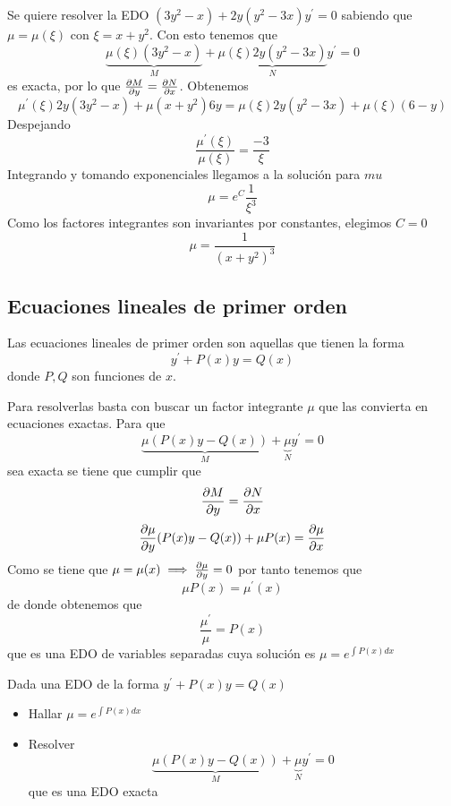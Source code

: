 \begin{example}
Se quiere resolver la EDO $(3y^2-x)+2y(y^2-3x)y^\prime = 0$ sabiendo que $\mu = \mu(\xi)$ con $\xi = x+y^2$. Con esto tenemos que $$\underbrace{\mu(\xi)(3y^2-x)}_M+\underbrace{\mu(\xi)2y(y^2-3x)}_Ny^\prime = 0$$ es exacta, por lo que $\partialder{y}{M} = \partialder{x}{N}$.
Obtenemos $$\mu^\prime(\xi)2y(3y^2-x)+\mu(x+y^2)6y = \mu(\xi)2y(y^2-3x)+\mu(\xi)(6-y)$$
Despejando $$\frac{\mu^\prime(\xi)}{\mu(\xi)} = \frac{-3}{\xi}$$
Integrando y tomando exponenciales llegamos a la solución para $mu$ $$\mu = e^C\frac{1}{\xi^3}$$
Como los factores integrantes son invariantes por constantes, elegimos $C=0$ $$\mu = \frac{1}{(x+y^2)^3}$$
\end{example}

\subsection{Ecuaciones lineales de primer orden}
Las ecuaciones lineales de primer orden son aquellas que tienen la forma $$y^\prime +P(x)y=Q(x)$$ donde $P,Q$ son funciones de $x$.

Para resolverlas basta con buscar un factor integrante $\mu$ que las convierta en ecuaciones exactas.
Para que
$$\underbrace{\mu(P(x)y-Q(x))}_M+\underbrace{\mu}_N y^\prime = 0$$
sea exacta se tiene que cumplir que $$\partialder{y}{M} = \partialder{x}{N}$$
$$\partialder{y}{\mu}(P(x)y-Q(x)) + \mu P(x) = \partialder{x}{\mu}$$
Como se tiene que $\mu = \mu(x) \implies \partialder{y}{\mu} = 0$ por tanto tenemos que $$\mu P(x) = \mu^\prime(x)$$ de donde obtenemos que $$\frac{\mu^\prime}{\mu} = P(x)$$ que es una EDO de variables separadas cuya solución es $\mu = e^{\int P(x)dx}$

\begin{method}
Dada una EDO de la forma $y^\prime +P(x)y = Q(x)$
\begin{itemize}
\item Hallar $\mu = e^{\int P(x)dx}$
\item Resolver $$\underbrace{\mu(P(x)y-Q(x))}_M+\underbrace{\mu}_N y^\prime = 0$$ que es una EDO exacta
\end{itemize}
\end{method}

